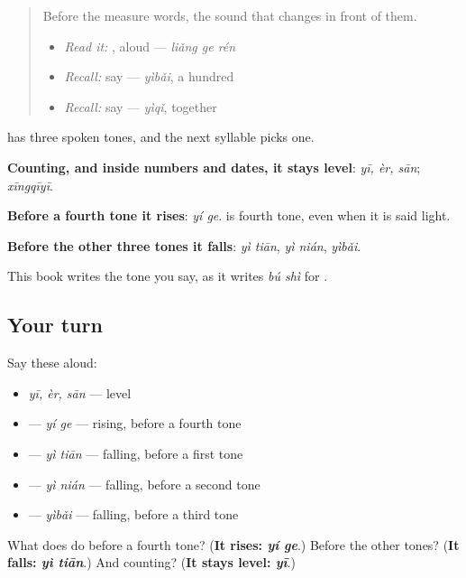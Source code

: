 \label{lesson:ZH-C88-yi-sandhi}



\begin{quote}
Before the measure words, the sound that changes in front of them.

\begin{itemize}
\raggedright
  \item \emph{Read it:} , aloud — \emph{liǎng ge rén}
  \item \emph{Recall:} say  — \emph{yìbǎi}, a hundred
  \item \emph{Recall:} say  — \emph{yìqǐ}, together
\end{itemize}
\end{quote}

\begin{sounds}
 has three spoken tones, and the next syllable picks one.

\textbf{Counting, and inside numbers and dates, it stays level}: \emph{yī, èr, sān}; \textbf{} \emph{xīngqīyī}.

\textbf{Before a fourth tone it rises}: \textbf{} \emph{yí ge}.  is fourth tone, even when it is said light.

\textbf{Before the other three tones it falls}: \textbf{} \emph{yì tiān}, \textbf{} \emph{yì nián}, \textbf{} \emph{yìbǎi}.

This book writes the tone you say, as it writes \emph{bú shì} for .
\end{sounds}

\subsection*{Your turn}
Say these aloud:

\begin{itemize}
\raggedright
  \item \emph{yī, èr, sān} — level
  \item {} — \emph{yí ge} — rising, before a fourth tone
  \item {} — \emph{yì tiān} — falling, before a first tone
  \item {} — \emph{yì nián} — falling, before a second tone
  \item {} — \emph{yìbǎi} — falling, before a third tone
\end{itemize}

\begin{tcolorbox}[breakable,colback=teal!4,colframe=teal!35!black,title={Before you move on}]
What does  do before a fourth tone? (\textbf{It rises: \emph{yí ge}}.) Before the other tones? (\textbf{It falls: \emph{yì tiān}}.) And counting? (\textbf{It stays level: \emph{yī}}.)
\end{tcolorbox}
